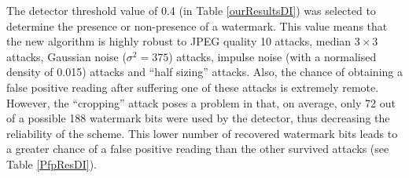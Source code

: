 \documentclass[12pt]{report}
\renewcommand{\baselinestretch}{1.5}
\begin{document}
The detector threshold value of 0.4 (in Table \ref{ourResultsDI}) was selected to determine the
presence or non-presence of a watermark. This value means that the new algorithm is
highly robust to JPEG quality 10 attacks, median $3 \times 3$ attacks, Gaussian noise ($\sigma^{2}=375$) attacks,
impulse noise (with a normalised density of 0.015) attacks and ``half sizing'' attacks. 
Also, the chance of obtaining a false positive reading after suffering one of these attacks is extremely remote.
However, the ``cropping'' attack poses a problem in that, 
on average, only 72 out of a possible 188 watermark bits were
used by the detector, thus decreasing the reliability of the scheme. This lower number of recovered 
watermark bits leads to a greater chance of a false positive reading than the other survived attacks
(see Table \ref{PfpResDI}).  
\begin{table}[!ht]
\renewcommand{\baselinestretch}{1.5}
\renewcommand{\baselinestretch}{1.5}
\caption{Worst case $P_{fp}$ values for the novel system using Lena image}
\label{PfpResDI}
\end{table}
\end{document}

